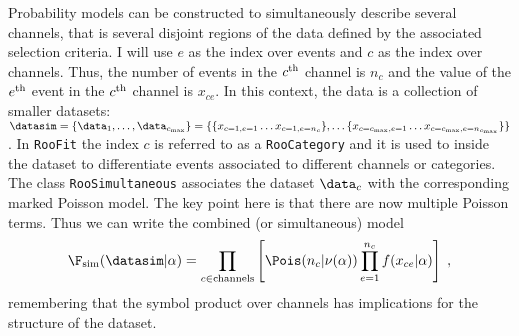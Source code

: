 Probability models can be constructed to simultaneously describe several channels, that is several disjoint regions of the data defined by the associated selection criteria.  I will use $e$ as the index over events and $c$ as the index over channels.  Thus, the number of events in the $c^{\rm th}$ channel is $n_c$ and the value of the $e^{\rm th}$ event in the $c^{\rm th}$ channel is $x_{ce}$.  In this context, the data is a collection of smaller datasets: \mbox{$\datasim=\{\data_1, \dots, \data_{c_{\rm max}}\}=\{\{x_{c=1,e=1}\dots x_{c=1,e=n_c}\}, \dots \{x_{c=c_{\rm max},e=1}\dots x_{c=c_{\rm max},e=n_{c_{\rm max}}} \}\}$}.  In \texttt{RooFit} the index $c$ is referred to as a \texttt{RooCategory} and it is used to inside the dataset to differentiate events associated to different channels or categories. The class \texttt{RooSimultaneous} associates the dataset $\data_c$ with the corresponding marked Poisson model.  The key point here is that there are now multiple Poisson terms.  Thus we can write the combined (or simultaneous) model 
\begin{equation}
\label{Eq:simultaneous}
\F_{\textrm{sim}}(\datasim|\alpha) = \prod_{c\in\rm channels} \left[ \Pois(n_c|\nu(\alpha)) \prod_{e=1}^{n_c} f(x_{ce}|\alpha) \right] \; ,
\end{equation}
remembering that the symbol product over channels has implications for the structure of the dataset.
